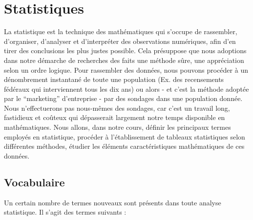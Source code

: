 \chapter{Statistiques}

La statistique est la technique des mathématiques qui s’occupe de rassembler, d’organiser, d’analyser et d’interpréter des observations numériques, afin d’en tirer des conclusions les plus justes possible.
Cela présuppose que nous adoptions dans notre démarche de recherches des faits une méthode sûre, une appréciation selon un ordre logique.
Pour rassembler des données, nous pouvons procéder à un dénombrement instantané de toute une population (Ex. des recensements fédéraux qui interviennent tous les dix ans) ou alors - et c’est la méthode adoptée par le “marketing” d’entreprise - par des sondages dans une population donnée. Nous n’effectuerons pas nous-mêmes des sondages, car c’est un travail long, fastidieux et coûteux qui dépasserait largement notre temps disponible en mathématiques. Nous allons, dans notre cours, définir les principaux termes employés en statistique, procéder à l’établissement de tableaux statistiques selon différentes méthodes, étudier les éléments caractéristiques mathématiques de ces données.

\section{Vocabulaire}

Un certain nombre de termes nouveaux sont présents dans toute analyse statistique. Il s’agit des termes suivants :

